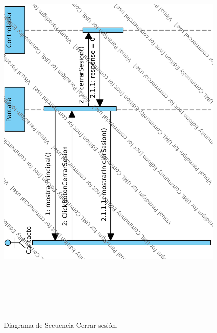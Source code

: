 			\begin{figure}[htbp!]
		\centering
			\includegraphics[width=15cm, height=20cm]{images/Diagramas/SecCerrar}
		\caption{Diagrama de Secuencia Cerrar sesi\'on.}
	\end{figure}

	
	\pagebreak